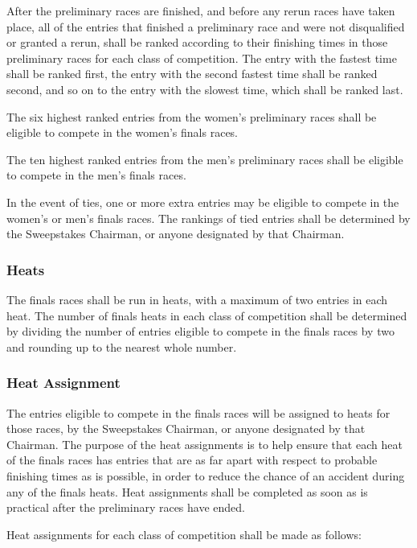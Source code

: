 	After the preliminary races are finished, and before any rerun races have taken
	place, all of the entries that finished a preliminary race and were not
	disqualified or granted a rerun, shall be ranked according to their finishing
	times in those preliminary races for each class of competition. The entry with
	the fastest time shall be ranked first, the entry with the second fastest time
	shall be ranked second, and so on to the entry with the slowest time, which
	shall be ranked last.

	The six highest ranked entries from the women's preliminary races shall be
	eligible to compete in the women's finals races.

	The ten highest ranked entries from the men's preliminary races shall be
	eligible to compete in the men's finals races.

	In the event of ties, one or more extra entries may be eligible to compete in
	the women's or men's finals races. The rankings of tied entries shall be
	determined by the Sweepstakes Chairman, or anyone designated by that Chairman.

\subsubsection{Heats}

	The finals races shall be run in heats, with a maximum of two entries in each
	heat. The number of finals heats in each class of competition shall be
	determined by dividing the number of entries eligible to compete in the finals
	races by two and rounding up to the nearest whole number.

\subsubsection{Heat Assignment}

	The entries eligible to compete in the finals races will be assigned to heats
	for those races, by the Sweepstakes Chairman, or anyone designated by that
	Chairman. The purpose of the heat assignments is to help ensure that each heat
	of the finals races has entries that are as far apart with respect to probable
	finishing times as is possible, in order to reduce the chance of an accident
	during any of the finals heats. Heat assignments shall be completed as soon as
	is practical after the preliminary races have ended.

	Heat assignments for each class of competition shall be made as follows:


